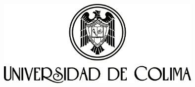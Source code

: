 	\begin{titlepage}
		
		\begin{center}
			\vspace*{-1in}
			\begin{figure}[htb]
				\begin{center}
					\includegraphics[width=10cm]{logo2}
				\end{center}
			\end{figure}
			

\end{center}
\end{titlepage}
